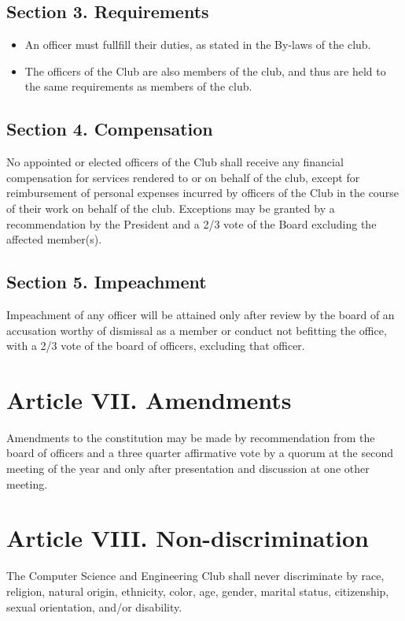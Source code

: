 \documentclass{article}
\begin{document}
  \subsection{Section 3. Requirements}
    \begin{itemize}
      \item An officer must fullfill their duties, as stated in the By-laws of the club.
      \item The officers of the Club are also members of the club, and thus are held to the same requirements as members of the club.
    \end{itemize}

  \subsection{Section 4. Compensation}
    No appointed or elected officers of the Club shall receive any financial compensation for services rendered to or on behalf of the club, except for reimbursement of personal expenses incurred by officers of the Club in the course of their work on behalf of the club. Exceptions may be granted by a recommendation by the President and a 2/3 vote of the Board excluding the affected member(s).

  \subsection{Section 5. Impeachment}
    Impeachment of any officer will be attained only after review by the board of an accusation worthy of dismissal as a member or conduct not befitting the office, with a 2/3 vote of the board of officers, excluding that officer.

\section{Article VII. Amendments}
  Amendments to the constitution may be made by recommendation from the board of officers and a three quarter affirmative vote by a quorum at the second meeting of the year and only after presentation and discussion at one other meeting.

\section{Article VIII. Non-discrimination}
  The Computer Science and Engineering Club shall never discriminate by race, religion, natural origin, ethnicity, color, age, gender, marital status, citizenship, sexual orientation, and/or disability.
\end{document}
